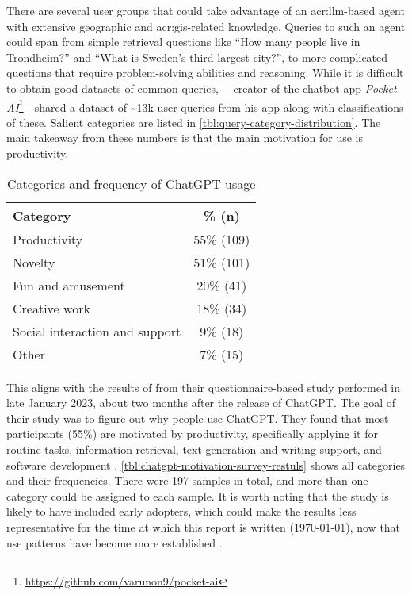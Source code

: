 There are several user groups that could take advantage of an \acrshort{acr:llm}-based agent with extensive geographic and \acrshort{acr:gis}-related knowledge. Queries to such an agent could span from simple retrieval questions like \enquote{How many people live in Trondheim?} and \enquote{What is Sweden's third largest city?}, to more complicated questions that require problem-solving abilities and reasoning. While it is difficult to obtain good datasets of common queries, \cite{kumarWhatArePeople2023a}---creator of the chatbot app \textit{Pocket AI}\footnote{\url{https://github.com/varunon9/pocket-ai}}---shared a dataset of \textasciitilde 13k user queries from his app along with classifications of these. Salient categories are listed in \autoref{tbl:query-category-distribution}. The main takeaway from these numbers is that the main motivation for use is productivity.

\begin{table}[ht]
    \centering
    \begin{tabular}[t]{l|c}
        \toprule
        \textbf{Category}              & \% \textbf{(n)} \\
        \midrule
        Productivity                   & 55\% (109)      \\
        Novelty                        & 51\% (101)      \\
        Fun and amusement              & 20\% (41)       \\
        Creative work                  & 18\% (34)       \\
        Social interaction and support & 9\% (18)        \\
        Other                          & 7\% (15)        \\
        \bottomrule
    \end{tabular}
    \caption{Categories and frequency of ChatGPT usage \citep[16-17]{skjuveWhyPeopleUse2023}}
    \label{tbl:chatgpt-motivation-survey-restuls}
\end{table}

This aligns with the results of \cite{skjuveWhyPeopleUse2023} from their questionnaire-based study performed in late January 2023, about two months after the release of ChatGPT. The goal of their study was to figure out why people use ChatGPT. They found that most participants (55\%) are motivated by productivity, specifically applying it for routine tasks, information retrieval, text generation and writing support, and software development \citep[17-21]{skjuveWhyPeopleUse2023}. \autoref{tbl:chatgpt-motivation-survey-restuls} shows all categories and their frequencies. There were 197 samples in total, and more than one category could be  assigned to each sample. It is worth noting that the study is likely to have included early adopters, which could make the results less representative for the time at which this report is written (\today), now that use patterns have become more established \citep[37]{skjuveWhyPeopleUse2023}.

